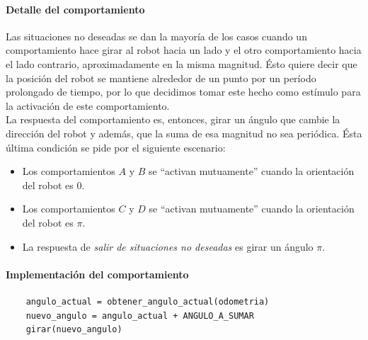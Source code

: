 \paragraph{Detalle del comportamiento}
Las situaciones no deseadas se dan la mayor\'ia de los casos cuando un comportamiento
hace girar al robot hacia un lado y el otro comportamiento hacia el lado contrario,
aproximadamente en la misma magnitud. \'Esto quiere decir que la posici\'on del
robot se mantiene alrededor de un punto por un per\'iodo prolongado de tiempo,
por lo que decidimos tomar este hecho como est\'imulo para la activaci\'on de este
comportamiento.
\\
La respuesta del comportamiento es, entonces, girar un \'angulo que cambie
la direcci\'on del robot y adem\'as, que la suma de esa magnitud no sea peri\'odica.
\'Esta \'ultima condici\'on se pide por el siguiente escenario:
\begin{itemize}
	\item Los comportamientos $A$ y $B$ se ``activan mutuamente'' cuando la orientaci\'on
			del robot es $0$.
	\item Los comportamientos $C$ y $D$ se ``activan mutuamente'' cuando la orientaci\'on
			del robot es $\pi$.
	\item La respuesta de \emph{salir de situaciones no deseadas} es girar un \'angulo $\pi$.
\end{itemize}

\paragraph{Implementaci\'on del comportamiento}
\begin{verbatim}
    angulo_actual = obtener_angulo_actual(odometria)
    nuevo_angulo = angulo_actual + ANGULO_A_SUMAR
    girar(nuevo_angulo)
\end{verbatim}

